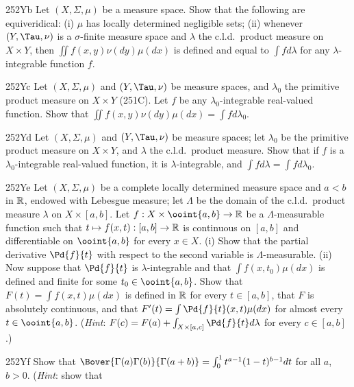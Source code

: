 {\spheader 252Yb Let $(X,\Sigma,\mu)$ be a measure space.   Show that the
following are equiveridical:  (i) $\mu$ has locally determined
negligible
sets;  (ii) whenever $(Y,\Tau,\nu)$ is a $\sigma$-finite measure
space and $\lambda$ the c.l.d.\ product measure on $X\times Y$, then
$\iint f(x,y)\nu(dy)\mu(dx)$ is defined and equal to $\int fd\lambda$
for any $\lambda$-integrable function $f$.

\spheader 252Yc Let $(X,\Sigma,\mu)$ and $(Y,\Tau,\nu)$ be measure
spaces, and $\lambda_0$
the primitive product measure on $X\times Y$ (251C).   Let $f$ be any
$\lambda_0$-integrable real-valued function.   Show that
$\iint f(x,y)\nu(dy)\mu(dx)=\int fd\lambda_0$.   

\spheader 252Yd Let $(X,\Sigma,\mu)$ and
$(Y,\Tau,\nu)$ be
measure spaces;  let $\lambda_0$ be the primitive product measure on
$X\times Y$, and $\lambda$ the c.l.d.\ product measure.   Show that  if
$f$ is a $\lambda_0$-integrable real-valued function, it is
$\lambda$-integrable, and $\int fd\lambda=\int fd\lambda_0$.

\spheader 252Ye
Let $(X,\Sigma,\mu)$ be a complete locally determined
measure space and $a<b$ in
$\Bbb R$, endowed with Lebesgue measure;  let $\Lambda$ be the domain of
the c.l.d.\ product measure $\lambda$ on $X\times[a,b]$.   Let
$f:X\times\ooint{a,b}\to\Bbb R$ be a $\Lambda$-measurable function such
that $t\mapsto f(x,t):[a,b]\to\Bbb R$ is continuous on $[a,b]$ and
differentiable on $\ooint{a,b}$ for every $x\in X$.   (i) Show that the
partial derivative $\Pd{f}{t}$ with respect to the second variable is
$\Lambda$-measurable.   (ii) Now suppose that $\Pd{f}{t}$ is
$\lambda$-integrable and that $\int f(x,t_0)\mu(dx)$ is defined and
finite for some $t_0\in\ooint{a,b}$.   Show that
$F(t)=\int f(x,t)\mu(dx)$ is defined in $\Bbb R$ for every $t\in[a,b]$,
that $F$ is absolutely continuous, and that
$F'(t)=\int\Pd{f}{t}(x,t)\mu(dx)$
for almost every $t\in\ooint{a,b}$.   ({\it Hint\/}:
$F(c)=F(a)+\int_{X\times[a,c]}\Pd{f}{t}d\lambda$ for every $c\in[a,b]$.)

\spheader 252Yf Show that
$\Bover{\Gamma(a)\Gamma(b)}{\Gamma(a+b)}=\int_0^1t^{a-1}(1-t)^{b-1}dt$
for all $a$, $b>0$.   ({\it Hint\/}:  show that


}
